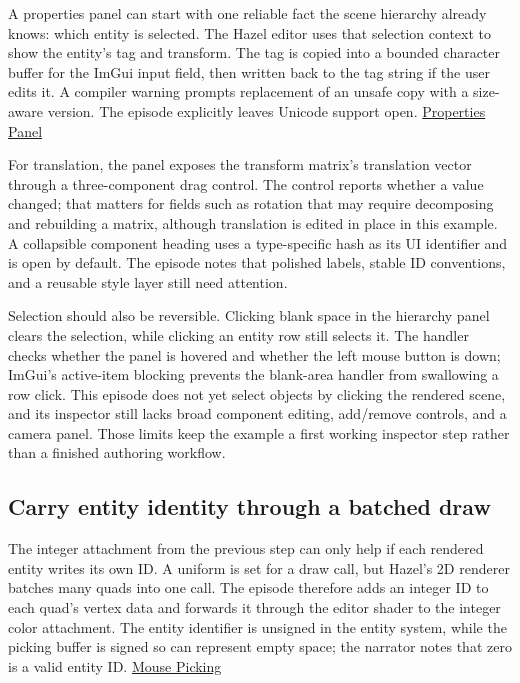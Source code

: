 \hypertarget{06-engine-ii-ch031-inspect-and-edit-the-selected-entity}{}

A properties panel can start with one reliable fact the scene hierarchy already knows: which entity is selected. The Hazel editor uses that selection context to show the entity's tag and transform. The tag is copied into a bounded character buffer for the ImGui input field, then written back to the tag string if the user edits it. A compiler warning prompts replacement of an unsafe copy with a size-aware version. The episode explicitly leaves Unicode support open. \href{https://www.youtube.com/watch?v=NBpB0qscF3E}{Properties Panel}

For translation, the panel exposes the transform matrix's translation vector through a three-component drag control. The control reports whether a value changed; that matters for fields such as rotation that may require decomposing and rebuilding a matrix, although translation is edited in place in this example. A collapsible component heading uses a type-specific hash as its UI identifier and is open by default. The episode notes that polished labels, stable ID conventions, and a reusable style layer still need attention.

Selection should also be reversible. Clicking blank space in the hierarchy panel clears the selection, while clicking an entity row still selects it. The handler checks whether the panel is hovered and whether the left mouse button is down; ImGui's active-item blocking prevents the blank-area handler from swallowing a row click. This episode does not yet select objects by clicking the rendered scene, and its inspector still lacks broad component editing, add/remove controls, and a camera panel. Those limits keep the example a first working inspector step rather than a finished authoring workflow.

\subsection{Carry entity identity through a batched draw}\label{06-engine-ii-ch031-carry-entity-identity-through-a-batched-draw}

\hypertarget{06-engine-ii-ch031-carry-entity-identity-through-a-batched-draw}{}

The integer attachment from the previous step can only help if each rendered entity writes its own ID. A uniform is set for a draw call, but Hazel's 2D renderer batches many quads into one call. The episode therefore adds an integer ID to each quad's vertex data and forwards it through the editor shader to the integer color attachment. The entity identifier is unsigned in the entity system, while the picking buffer is signed so  can represent empty space; the narrator notes that zero is a valid entity ID. \href{https://www.youtube.com/watch?v=GKERbQ7Sqyg}{Mouse Picking}

